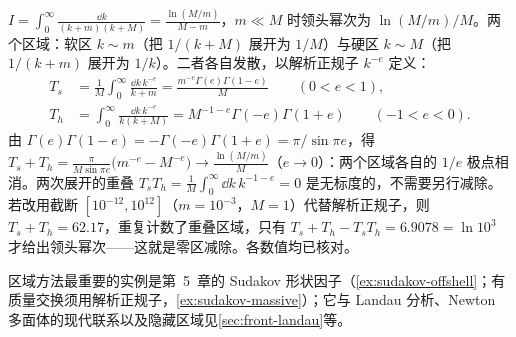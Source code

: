 \begin{example}[一维玩具积分与零区减除]\label{ex:ir-regions-toy}
$I=\int_0^\infty\frac{\dd k}{(k+m)(k+M)}=\frac{\ln(M/m)}{M-m}$，$m\ll M$ 时领头幂次为 $\ln(M/m)/M$。两个区域：软区 $k\sim m$（把 $1/(k+M)$ 展开为 $1/M$）与硬区 $k\sim M$（把 $1/(k+m)$ 展开为 $1/k$）。二者各自发散，以解析正规子 $k^{-e}$ 定义：
\begin{equation}\label{eq:ir-toy-regions}
\begin{aligned}
T_s&=\frac1M\int_0^\infty\frac{\dd k\,k^{-e}}{k+m}=\frac{m^{-e}\Gamma(e)\Gamma(1-e)}{M}\qquad(0<e<1),\\
T_h&=\int_0^\infty\frac{\dd k\,k^{-e}}{k(k+M)}=M^{-1-e}\Gamma(-e)\Gamma(1+e)\qquad(-1<e<0).
\end{aligned}
\end{equation}
由 $\Gamma(e)\Gamma(1-e)=-\Gamma(-e)\Gamma(1+e)=\pi/\sin\pi e$，得 $T_s+T_h=\frac{\pi}{M\sin\pi e}\big(m^{-e}-M^{-e}\big)\to\frac{\ln(M/m)}{M}$（$e\to0$）：两个区域各自的 $1/e$ 极点相消。两次展开的重叠 $T_sT_h=\frac1M\int_0^\infty\dd k\,k^{-1-e}=0$ 是无标度的，不需要另行减除。若改用截断 $[10^{-12},10^{12}]$（$m=10^{-3}$，$M=1$）代替解析正规子，则 $T_s+T_h=62.17$，重复计数了重叠区域，只有 $T_s+T_h-T_sT_h=6.9078=\ln10^3$ 才给出领头幂次——这就是零区减除。各数值均已核对。
\end{example}

区域方法最重要的实例是第~5~章的 Sudakov 形状因子（\cref{ex:sudakov-offshell}；有质量交换须用解析正规子，\cref{ex:sudakov-massive}）；它与 Landau 分析、Newton 多面体的现代联系以及隐藏区域见\cref{sec:front-landau}等。

